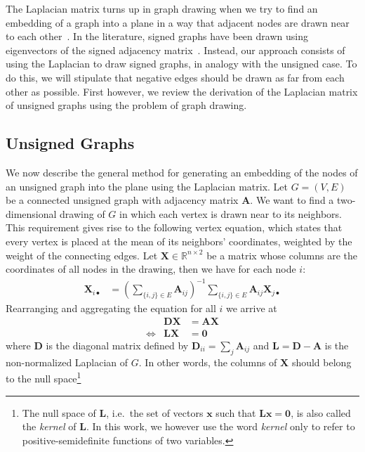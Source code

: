 \documentclass[11pt,a4paper]{book}
\begin{document}
The Laplacian matrix turns up in
graph drawing when we try to find an embedding of a graph into a plane in
a way that adjacent nodes are drawn near to each other~\cite{b287}.
In the literature, signed graphs have been drawn using eigenvectors of
the signed adjacency matrix~\cite{b400}.  
Instead, our approach consists of using the Laplacian to draw signed
graphs, in analogy with the unsigned case. 
To do this, we will stipulate that negative edges should be drawn as far
from each other as possible.
First however, we review the derivation of the Laplacian matrix of
unsigned graphs using the problem of graph drawing. 

\subsection{Unsigned Graphs}
We now describe the general method for generating an embedding of the
nodes of an unsigned graph into the plane using the Laplacian matrix.
Let $G=(V,E)$ be a connected unsigned graph with adjacency matrix
$\mathbf A$. 
We want to find a two-dimensional drawing of $G$
in which each vertex is drawn near to its neighbors.  This requirement
gives rise to the following vertex equation, which states that every
vertex is placed at the mean of its neighbors' coordinates, weighted by
the weight of the connecting edges.  Let $\mathbf X \in
\mathbb{R}^{n\times 2}$ be a matrix whose columns are the coordinates of
all nodes in the drawing, then we have for each node $i$: 
\begin{align}
  \mathbf X_{i \bullet} &= \left(\sum_{\{i,j\}\in E} \mathbf A_{ij}\right)^{-1}
  \sum_{\{i,j\}\in E}
  \mathbf A_{ij} \mathbf X_{j \bullet} \label{eq:mean}
\end{align}
Rearranging and aggregating the equation for all $i$ we arrive at
\begin{align}
  && \mathbf D \mathbf X &= \mathbf A \mathbf X  & \label{eq:dx_ax} \\
  &\Leftrightarrow& \mathbf L \mathbf X &= \mathbf 0 & \nonumber
\end{align}
where $\mathbf D$ is the diagonal matrix defined by $\mathbf D_{ii} =
\sum_j \mathbf A_{ij}$ and
$\mathbf L=\mathbf D-\mathbf A$ is the non-normalized Laplacian of $G$.
In other words, the columns of $\mathbf X$
should belong to the null space\footnote{The null space of $\mathbf L$, i.e.\ the set of
  vectors $\mathbf x$ such that $\mathbf L \mathbf x=\mathbf 0$, is also called
  the \emph{kernel} of $\mathbf L$.  
  In this work, we however use the word \emph{kernel} only to refer to
  positive-semidefinite functions of two variables.}
\end{document}
